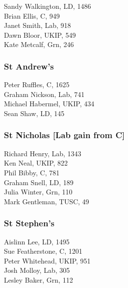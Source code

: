 \documentclass[a4paper,openany,10pt]{book}
\begin{document}
Sandy Walkington, LD, 1486\\
Brian Ellis, C, 949\\
Janet Smith, Lab, 918\\
Dawn Bloor, UKIP, 549\\
Kate Metcalf, Grn, 246\\


\subsubsection*{St Andrew's}



Peter Ruffles, C, 1625\\
Graham Nickson, Lab, 741\\
Michael Habermel, UKIP, 434\\
Sean Shaw, LD, 145\\


\subsubsection*{St Nicholas \hspace*{\fill}\nolinebreak[1]%
\enspace\hspace*{\fill}
[Lab gain from C]}



Richard Henry, Lab, 1343\\
Ken Neal, UKIP, 822\\
Phil Bibby, C, 781\\
Graham Snell, LD, 189\\
Julia Winter, Grn, 110\\
Mark Gentleman, TUSC, 49\\


\subsubsection*{St Stephen's}



Aislinn Lee, LD, 1495\\
Sue Featherstone, C, 1201\\
Peter Whitehead, UKIP, 951\\
Josh Molloy, Lab, 305\\
Lesley Baker, Grn, 112\\
\end{document}
